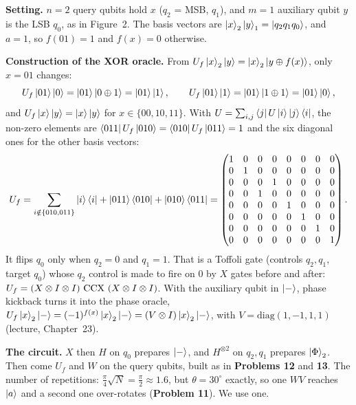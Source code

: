 \documentclass[a4paper, 10pt]{article}
\begin{document}
\begin{solution}
	\noindent \textbf{Setting.} \( n = 2 \) query qubits hold \( x \) (\( q_2 \) = MSB, \( q_1 \)), and \( m = 1 \) auxiliary qubit \( y \) is the LSB \( q_0 \), as in Figure~2. The basis vectors are \( \ket{x}_2\ket{y}_1 = \ket{q_2 q_1 q_0} \), and \( a = 1 \), so \( f(01) = 1 \) and \( f(x) = 0 \) otherwise.

	\myspace

	\noindent \textbf{Construction of the XOR oracle.} From \( U_f\ket{x}_2\ket{y} = \ket{x}_2\ket{y \oplus f(x)} \), only \( x = 01 \) changes:
	\[
		U_f\ket{01}\ket{0} = \ket{01}\ket{0 \oplus 1} = \ket{01}\ket{1}, \qquad U_f\ket{01}\ket{1} = \ket{01}\ket{1 \oplus 1} = \ket{01}\ket{0},
	\]
	and \( U_f\ket{x}\ket{y} = \ket{x}\ket{y} \) for \( x \in \{00, 10, 11\} \). With \( U = \sum_{i, j}\bra{j}U\ket{i}\ket{j}\bra{i} \), the non-zero elements are \( \bra{011}U_f\ket{010} = \bra{010}U_f\ket{011} = 1 \) and the six diagonal ones for the other basis vectors:
	\[
		U_f = \sum_{i \notin \{010, 011\}}\ket{i}\bra{i} + \ket{011}\bra{010} + \ket{010}\bra{011}
		= \begin{pmatrix}
			1 & 0 & 0 & 0 & 0 & 0 & 0 & 0 \\
			0 & 1 & 0 & 0 & 0 & 0 & 0 & 0 \\
			0 & 0 & 0 & 1 & 0 & 0 & 0 & 0 \\
			0 & 0 & 1 & 0 & 0 & 0 & 0 & 0 \\
			0 & 0 & 0 & 0 & 1 & 0 & 0 & 0 \\
			0 & 0 & 0 & 0 & 0 & 1 & 0 & 0 \\
			0 & 0 & 0 & 0 & 0 & 0 & 1 & 0 \\
			0 & 0 & 0 & 0 & 0 & 0 & 0 & 1
		\end{pmatrix}.
	\]
	It flips \( q_0 \) only when \( q_2 = 0 \) and \( q_1 = 1 \). That is a Toffoli gate (controls \( q_2, q_1 \), target \( q_0 \)) whose \( q_2 \) control is made to fire on \( 0 \) by \( X \) gates before and after: \( U_f = \left(X \otimes I \otimes I\right)\,\mathrm{CCX}\,\left(X \otimes I \otimes I\right) \).
	With the auxiliary qubit in \( \ket{-} \), phase kickback turns it into the phase oracle, \( U_f\ket{x}_2\ket{-} = (-1)^{f(x)}\ket{x}_2\ket{-} = \left(V \otimes I\right)\ket{x}_2\ket{-} \), with \( V = \mathrm{diag}(1, -1, 1, 1) \) (lecture, Chapter~23).

	\myspace

	\noindent \textbf{The circuit.} \( X \) then \( H \) on \( q_0 \) prepares \( \ket{-} \), and \( H^{\otimes 2} \) on \( q_2, q_1 \) prepares \( \ket{\Phi}_2 \). Then come \( U_f \) and \( W \) on the query qubits, built as in \textbf{Problems 12} and \textbf{13}.
	The number of repetitions: \( \tfrac{\pi}{4}\sqrt{N} = \tfrac{\pi}{2} \approx 1.6 \), but \( \theta = 30^\circ \) exactly, so one \( WV \) reaches \( \ket{a} \) and a second one over-rotates (\textbf{Problem 11}). We use one.


\end{solution}
\end{document}
